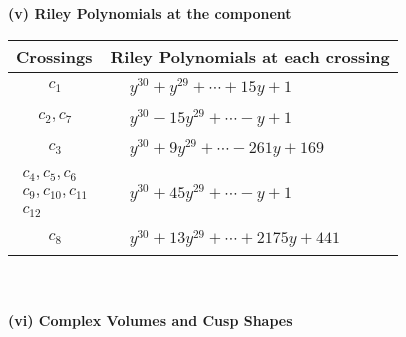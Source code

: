 \documentclass[1p]{elsarticle_modified}
\theoremstyle{definition}
\begin{document}
\newpage\renewcommand{\arraystretch}{1}
\flushleft \textbf{(v) Riley Polynomials at the component}\newline \\
\begin{tabular}{m{50pt}|m{274pt}}
Crossings & \hspace{64pt}Riley Polynomials at each crossing \\
\hline $$\begin{aligned}c_{1}\end{aligned}$$&$\begin{aligned}
&y^{30}+y^{29}+\cdots+15 y+1
\end{aligned}$\\
\hline $$\begin{aligned}c_{2},c_{7}\end{aligned}$$&$\begin{aligned}
&y^{30}-15 y^{29}+\cdots- y+1
\end{aligned}$\\
\hline $$\begin{aligned}c_{3}\end{aligned}$$&$\begin{aligned}
&y^{30}+9 y^{29}+\cdots-261 y+169
\end{aligned}$\\
\hline $$\begin{aligned}c_{4},c_{5},c_{6}\\c_{9},c_{10},c_{11}\\c_{12}\end{aligned}$$&$\begin{aligned}
&y^{30}+45 y^{29}+\cdots- y+1
\end{aligned}$\\
\hline $$\begin{aligned}c_{8}\end{aligned}$$&$\begin{aligned}
&y^{30}+13 y^{29}+\cdots+2175 y+441
\end{aligned}$\\
\hline
\end{tabular}\\~\\
\newpage\flushleft \textbf{(vi) Complex Volumes and Cusp Shapes}
\end{document}
